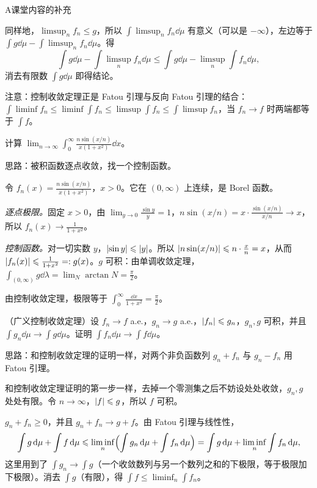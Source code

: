 \begin{exercises}{A}{课堂内容的补充}
\begin{solution}
同样地，$\limsup_nf_n\leqslant g$，所以 $\int\limsup_nf_n\dd\mu$ 有意义（可以是 $-\infty$），左边等于 $\int g\dd\mu-\int\limsup_nf_n\dd\mu$。得
\[
\int g\dd\mu-\int\limsup_nf_n\dd\mu\leqslant\int g\dd\mu-\limsup_n\int f_n\dd\mu ,
\]
消去有限数 $\int g\dd\mu$ 即得结论。

注意：控制收敛定理正是 Fatou 引理与反向 Fatou 引理的结合：$\int\liminf f_n\leqslant\liminf\int f_n\leqslant\limsup\int f_n\leqslant\int\limsup f_n$，当 $f_n\to f$ 时两端都等于 $\int f$。
\end{solution}

\item\label{ex:integration:A12} 计算 $\displaystyle\lim_{n\to\infty}\int_0^\infty\frac{n\sin(x/n)}{x(1+x^2)}\dd x$。
\begin{solution}
思路：被积函数逐点收敛，找一个控制函数。

令 $f_n(x)=\frac{n\sin(x/n)}{x(1+x^2)}$，$x>0$。它在 $(0,\infty)$ 上连续，是 Borel 函数。

\emph{逐点极限。}固定 $x>0$，由 $\lim_{y\to0}\frac{\sin y}y=1$，$n\sin(x/n)=x\cdot\frac{\sin(x/n)}{x/n}\to x$，所以 $f_n(x)\to\frac1{1+x^2}$。

\emph{控制函数。}对一切实数 $y$，$\lvert \sin y\rvert\leqslant\lvert y\rvert$。所以 $\lvert n\sin(x/n)\rvert\leqslant n\cdot\frac xn=x$，从而 $\lvert f_n(x)\rvert\leqslant\frac1{1+x^2}=:g(x)$。$g$ 可积：由单调收敛定理，$\int_{(0,\infty)}g\dd\lambda=\lim_N\arctan N=\frac\pi2$。

由控制收敛定理，极限等于 $\int_0^\infty\frac{\dd x}{1+x^2}=\frac\pi2$。
\end{solution}

\item\label{ex:integration:A13} （广义控制收敛定理）设 $f_n\to f$ a.e.，$g_n\to g$ a.e.，$\lvert f_n\rvert\leqslant g_n$，$g_n,g$ 可积，并且 $\int g_n\dd\mu\to\int g\dd\mu$。证明 $\int f_n\dd\mu\to\int f\dd\mu$。
\begin{solution}
思路：和控制收敛定理的证明一样，对两个非负函数列 $g_n+f_n$ 与 $g_n-f_n$ 用 Fatou 引理。

和控制收敛定理证明的第一步一样，去掉一个零测集之后不妨设处处收敛，$g_n,g$ 处处有限。令 $n\to\infty$，$\lvert f\rvert\leqslant g$，所以 $f$ 可积。

$g_n+f_n\geqslant0$，并且 $g_n+f_n\to g+f$。由 Fatou 引理与线性性，
\[
\int g\,\mathrm{d}\mu+\int f\,\mathrm{d}\mu\leqslant\liminf_n\Bigl(\int g_n\,\mathrm{d}\mu+\int f_n\,\mathrm{d}\mu\Bigr)=\int g\,\mathrm{d}\mu+\liminf_n\int f_n\,\mathrm{d}\mu ,
\]
这里用到了 $\int g_n\to\int g$（一个收敛数列与另一个数列之和的下极限，等于极限加下极限）。消去 $\int g$（有限），得 $\int f\leqslant\liminf_n\int f_n$。


\end{solution}
\end{exercises}
